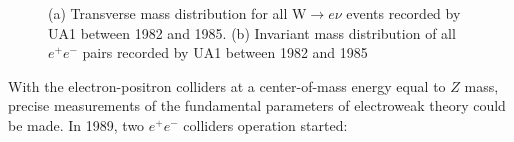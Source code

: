 \begin{figure}
\centering%
\caption{(a) Transverse mass distribution for all W$\to e \nu$ events recorded by UA1 between 1982 and 1985. (b) Invariant mass distribution of all $e^+e^-$
pairs recorded by UA1 between 1982 and 1985}
\label{rubbia_f}
\end{figure}
With the electron-positron colliders at a center-of-mass energy equal to $Z$ mass, precise measurements of the fundamental parameters of electroweak theory could be made.  In 1989, two  $e^+e^-$ colliders operation started:
